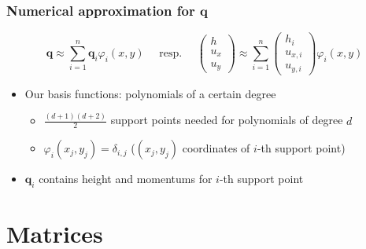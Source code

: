 \documentclass{beamer}
\newcommand{\todo}[1]{
  \textcolor{red}{TODO: #1}
  \note{\textcolor{red}{TODO: #1}}
}
\renewcommand{\todo}[1]{}
\newcommand{\pd}[2]{\dfrac{\partial #1}{\partial #2}}
\renewcommand{\phi}{\varphi}
\begin{document}
\begin{frame}
  \frametitle{Numerical approximation for $\mathbf{q}$}
  \begin{equation*}
    \mathbf{q} \approx \sum_{i=1}^n \mathbf{q}_i \phi_i(x,y) 
    \quad \text{ resp. } \quad
    \begin{pmatrix}
      h \\ u_x \\ u_y
    \end{pmatrix} \approx
    \sum_{i=1}^n
    \begin{pmatrix}
      h_i \\ u_{x,i} \\ u_{y,i}
    \end{pmatrix}
    \phi_i(x,y) 
  \end{equation*}
  \begin{itemize}
  \item Our basis functions: polynomials of a certain degree
    \begin{itemize}
    \item $\frac{(d+1)(d+2)}{2}$ support points needed for polynomials of degree $d$
    \item $\phi_i (x_j,y_j) = \delta_{i,j}$ ($(x_j,y_j)$ coordinates of $i$-th support point)
    \end{itemize}
  \item $\mathbf{q}_i$ contains height and momentums for $i$-th support point
  \end{itemize}
\end{frame}

\section{Matrices}

  
\end{document}
